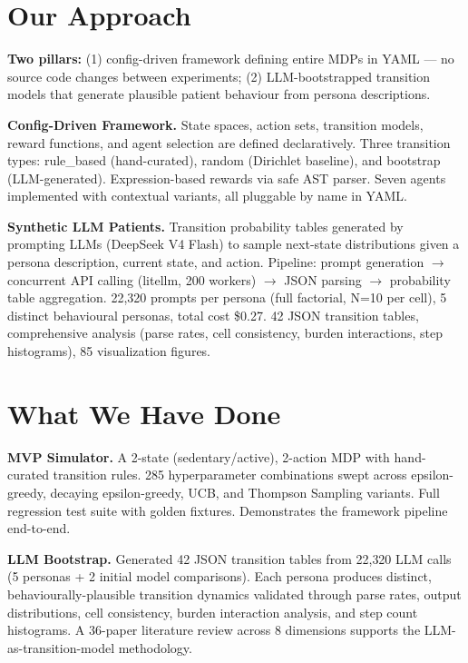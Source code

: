 \documentclass[10pt,a4paper]{article}
\begin{document}
\section{Our Approach}
\vspace{-2pt}
\textbf{Two pillars:} (1) config-driven framework defining entire MDPs in YAML --- no source code changes between experiments; (2) LLM-bootstrapped transition models that generate plausible patient behaviour from persona descriptions.

\textbf{Config-Driven Framework.} State spaces, action sets, transition models, reward functions, and agent selection are defined declaratively. Three transition types: rule\_based (hand-curated), random (Dirichlet baseline), and bootstrap (LLM-generated). Expression-based rewards via safe AST parser. Seven agents implemented with contextual variants, all pluggable by name in YAML.

\textbf{Synthetic LLM Patients.} Transition probability tables generated by prompting LLMs (DeepSeek V4 Flash) to sample next-state distributions given a persona description, current state, and action. Pipeline: prompt generation \(\rightarrow\) concurrent API calling (litellm, 200 workers) \(\rightarrow\) JSON parsing \(\rightarrow\) probability table aggregation. 22{,}320 prompts per persona (full factorial, N=10 per cell), 5 distinct behavioural personas, total cost \$0.27. 42 JSON transition tables, comprehensive analysis (parse rates, cell consistency, burden interactions, step histograms), 85 visualization figures.

\section{What We Have Done}
\vspace{-2pt}
\textbf{MVP Simulator.} A 2-state (sedentary/active), 2-action MDP with hand-curated transition rules. 285 hyperparameter combinations swept across epsilon-greedy, decaying epsilon-greedy, UCB, and Thompson Sampling variants. Full regression test suite with golden fixtures. Demonstrates the framework pipeline end-to-end.

\textbf{LLM Bootstrap.} Generated 42 JSON transition tables from 22{,}320 LLM calls (5 personas + 2 initial model comparisons). Each persona produces distinct, behaviourally-plausible transition dynamics validated through parse rates, output distributions, cell consistency, burden interaction analysis, and step count histograms. A 36-paper literature review across 8 dimensions supports the LLM-as-transition-model methodology.
\end{document}
